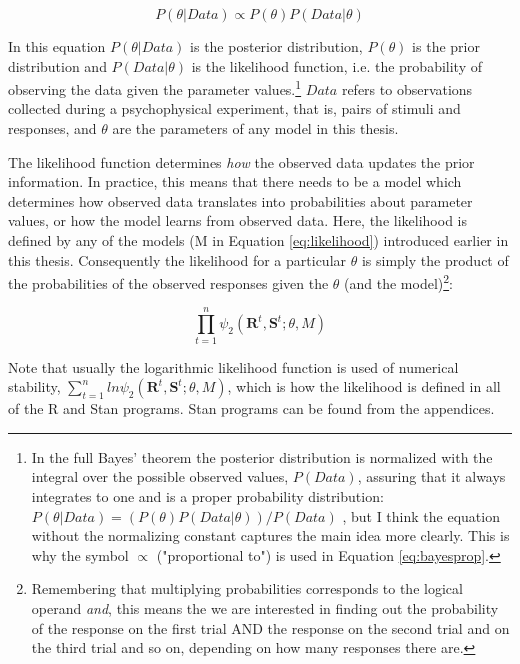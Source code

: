 \documentclass{article}\usepackage{knitr}
\begin{document}
\begin{equation}
P(\theta | Data) \propto P(\theta) P(Data | \theta)
\label{eq:bayesprop}
\end{equation} 

In this equation $P(\theta | Data)$ is the posterior distribution, $P(\theta)$ is the prior distribution and $P(Data | \theta)$ is the likelihood function, i.e. the probability of observing the data given the parameter values.\footnote{In the full Bayes' theorem the posterior distribution is normalized with the integral over the possible observed values, $P(Data)$, assuring that it always integrates to one and is a proper probability distribution: $P(\theta | Data) = (P(\theta) P(Data | \theta)) / P(Data)$ \citep{kruschke2015}, but I think the equation without the normalizing constant captures the main idea more clearly. This is why the symbol $\propto$ ("proportional to") is used in Equation \ref{eq:bayesprop}.} $Data$ refers to observations collected during a psychophysical experiment, that is, pairs of stimuli and responses, and $\theta$ are the parameters of any model in this thesis. 

The likelihood function determines \textit{how} the observed data updates the prior information. In practice, this means that there needs to be a model which determines how observed data translates into probabilities about parameter values, or how the model learns from observed data. Here, the likelihood is defined by any of the models (M in Equation \ref{eq:likelihood}) introduced earlier in this thesis. Consequently the likelihood for a particular $\theta$ is simply the product of the probabilities of the observed responses given the $\theta$ (and the model)\footnote{Remembering that multiplying probabilities corresponds to the logical operand \textit{and}, this means the we are interested in finding out the probability of the response on the first trial AND the response on the second trial and on the third trial and so on, depending on how many responses there are.}:

\begin{equation}
\prod_{t=1}^n \psi_2(\bm{R}^t, \bm{S}^t; \theta, M)
\label{eq:likelihood}
\end{equation}

Note that usually the logarithmic likelihood function is used of numerical stability, $\sum_{t=1}^n ln \psi_2(\bm{R}^t, \bm{S}^t; \theta, M)$, which is how the likelihood is defined in all of the R and Stan programs. Stan programs can be found from the appendices. 
\end{document}
